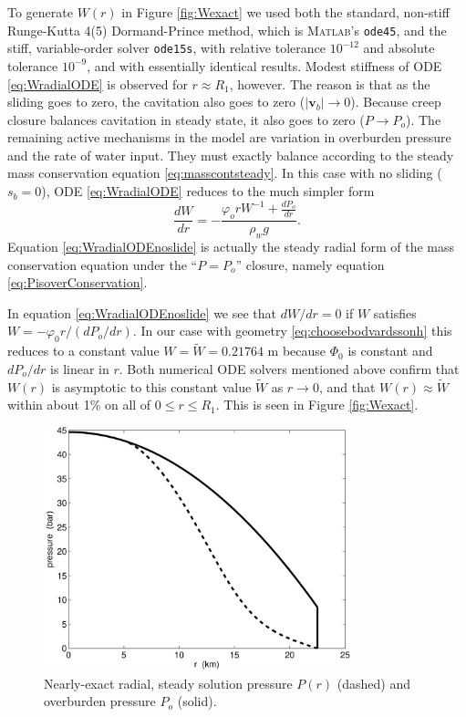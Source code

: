 \documentclass[11pt,final]{amsart}%
\newcommand\bv{\mathbf{v}}
\newcommand\Matlab{\textsc{Matlab}\xspace}
\begin{document}
To generate $W(r)$ in Figure \ref{fig:Wexact} we used both the standard, non-stiff Runge-Kutta 4(5) Dormand-Prince method, which is \Matlab's \texttt{ode45}, and the stiff, variable-order solver \texttt{ode15s}, with relative tolerance $10^{-12}$ and absolute tolerance $10^{-9}$, and with essentially identical results.
Modest stiffness \citep{AscherPetzold} of ODE \eqref{eq:WradialODE} is observed for $r\approx R_1$, however.  The reason is that as the sliding goes to zero, the cavitation also goes to zero ($|\bv_b|\to 0$).  Because creep closure balances cavitation in steady state, it also goes to zero ($P\to P_o$).  The remaining active mechanisms in the model are variation in overburden pressure and the rate of water input.  They must exactly balance according to the steady mass conservation equation \eqref{eq:masscontsteady}.  In this case with no sliding ($s_b=0$), ODE \eqref{eq:WradialODE} reduces to the much simpler form
\begin{equation}
\frac{dW}{dr} = - \frac{\varphi_o r W^{-1} + \frac{dP_o}{dr}}{\rho_w g}. \label{eq:WradialODEnoslide}
\end{equation}
Equation \eqref{eq:WradialODEnoslide} is actually the steady radial form of the mass conservation equation under the ``$P=P_o$'' closure, namely equation \eqref{eq:PisoverConservation}.

In equation \eqref{eq:WradialODEnoslide} we see that $dW/dr=0$ if $W$ satisfies $W = - \varphi_0 r / (dP_o/dr)$.  In our case with geometry \eqref{eq:choosebodvardssonh} this reduces to a constant value $W=\tilde W= 0.21764$ m because $\Phi_0$ is constant and $dP_o/dr$ is linear in $r$.  Both numerical ODE solvers mentioned above confirm that $W(r)$ is asymptotic to this constant value $\tilde W$ as $r\to 0$, and that $W(r)\approx \tilde W$ within about 1\% on all of $0\le r \le R_1$.  This is seen in Figure \ref{fig:Wexact}.

\begin{figure}[ht]
\includegraphics[width=3.5in,keepaspectratio=true]{exact-P-plot}
\caption{Nearly-exact radial, steady solution pressure $P(r)$ (dashed) and overburden pressure $P_o$ (solid).}
\label{fig:Pexact}
\end{figure}
\end{document}
